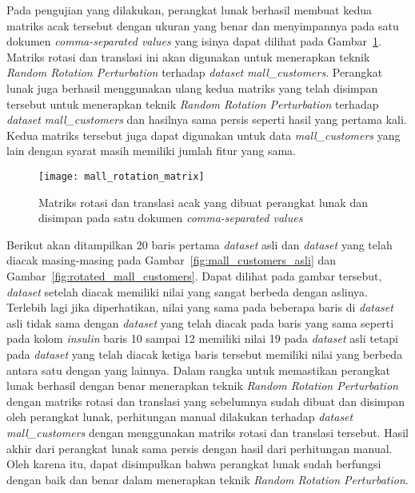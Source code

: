 Pada pengujian yang dilakukan, perangkat lunak berhasil membuat kedua matriks acak tersebut dengan ukuran yang benar dan menyimpannya pada satu dokumen \textit{comma-separated values} yang isinya dapat dilihat pada Gambar~\ref{fig:mall_rotation_matrix}. Matriks rotasi dan translasi ini akan digunakan untuk menerapkan teknik \textit{Random Rotation Perturbation} terhadap \textit{dataset} \textit{mall\_customers}. Perangkat lunak juga berhasil menggunakan ulang kedua matriks yang telah disimpan tersebut untuk menerapkan teknik \textit{Random Rotation Perturbation} terhadap \textit{dataset} \textit{mall\_customers} dan hasilnya sama persis seperti hasil yang pertama kali. Kedua matriks tersebut juga dapat digunakan untuk data \textit{mall\_customers} yang lain dengan syarat masih memiliki jumlah fitur yang sama.

\begin{figure}
	\centering
	\texttt{[image: mall\_rotation\_matrix]}
	\caption{Matriks rotasi dan translasi acak yang dibuat perangkat lunak dan disimpan pada satu dokumen  \textit{comma-separated values}}
	\label{fig:mall_rotation_matrix}
\end{figure}

Berikut akan ditampilkan 20 baris pertama \textit{dataset} asli dan \textit{dataset} yang telah diacak masing-masing pada Gambar~\ref{fig:mall_customers_asli} dan Gambar~\ref{fig:rotated_mall_customers}. Dapat dilihat pada gambar tersebut, \textit{dataset} setelah diacak memiliki nilai yang sangat berbeda dengan aslinya. Terlebih lagi jika diperhatikan, nilai yang sama pada beberapa baris di \textit{dataset} asli tidak sama dengan \textit{dataset} yang telah diacak pada baris yang sama seperti pada kolom \textit{insulin} baris 10 sampai 12 memiliki nilai 19 pada \textit{dataset} asli tetapi pada \textit{dataset} yang telah diacak ketiga baris tersebut memiliki nilai yang berbeda antara satu dengan yang lainnya. Dalam rangka untuk memastikan perangkat lunak berhasil dengan benar menerapkan teknik \textit{Random Rotation Perturbation} dengan matriks rotasi dan translasi yang sebelumnya sudah dibuat dan disimpan oleh perangkat lunak, perhitungan manual dilakukan terhadap \textit{dataset} \textit{mall\_customers} dengan menggunakan matriks rotasi dan translasi tersebut. Hasil akhir dari perangkat lunak sama persis dengan hasil dari perhitungan manual. Oleh karena itu, dapat disimpulkan bahwa perangkat lunak sudah berfungsi dengan baik dan benar dalam menerapkan teknik \textit{Random Rotation Perturbation}.

